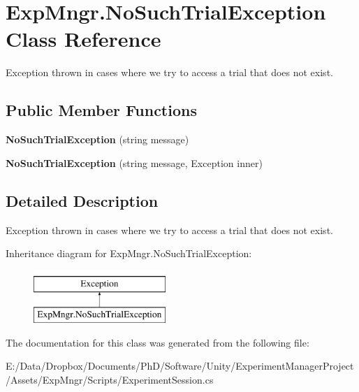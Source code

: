 \hypertarget{class_exp_mngr_1_1_no_such_trial_exception}{}\section{Exp\+Mngr.\+No\+Such\+Trial\+Exception Class Reference}
\label{class_exp_mngr_1_1_no_such_trial_exception}


Exception thrown in cases where we try to access a trial that does not exist.  


\subsection*{Public Member Functions}
\begin{DoxyCompactItemize}
\item 
\mbox{\label{class_exp_mngr_1_1_no_such_trial_exception_af032a1b09401a72d0159848d5d48d052}} 
{\bfseries No\+Such\+Trial\+Exception} (string message)
\item 
\mbox{\label{class_exp_mngr_1_1_no_such_trial_exception_a1ae847037ef89c2f23251523687a10a1}} 
{\bfseries No\+Such\+Trial\+Exception} (string message, Exception inner)
\end{DoxyCompactItemize}


\subsection{Detailed Description}
Exception thrown in cases where we try to access a trial that does not exist. 

Inheritance diagram for Exp\+Mngr.\+No\+Such\+Trial\+Exception\+:\begin{figure}[H]
\begin{center}
\leavevmode
\includegraphics[height=2.000000cm]{class_exp_mngr_1_1_no_such_trial_exception}
\end{center}
\end{figure}


The documentation for this class was generated from the following file\+:\begin{DoxyCompactItemize}
\item 
E\+:/\+Data/\+Dropbox/\+Documents/\+Ph\+D/\+Software/\+Unity/\+Experiment\+Manager\+Project/\+Assets/\+Exp\+Mngr/\+Scripts/Experiment\+Session.\+cs\end{DoxyCompactItemize}

